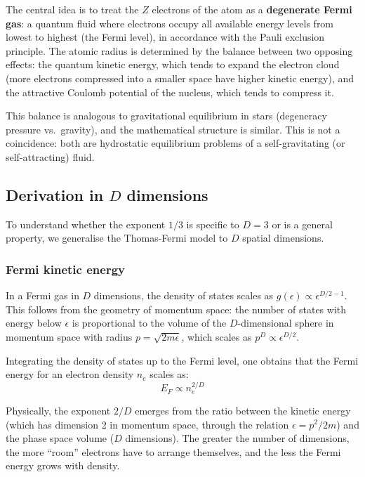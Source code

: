 \documentclass[10pt,a4paper]{article}
\begin{document}
The central idea is to treat the $Z$ electrons of the atom as a \textbf{degenerate Fermi gas}: a quantum fluid where electrons occupy all available energy levels from lowest to highest (the Fermi level), in accordance with the Pauli exclusion principle. The atomic radius is determined by the balance between two opposing effects: the quantum kinetic energy, which tends to expand the electron cloud (more electrons compressed into a smaller space have higher kinetic energy), and the attractive Coulomb potential of the nucleus, which tends to compress it.

This balance is analogous to gravitational equilibrium in stars (degeneracy pressure vs.\ gravity), and the mathematical structure is similar. This is not a coincidence: both are hydrostatic equilibrium problems of a self-gravitating (or self-attracting) fluid.

\subsection{Derivation in $D$ dimensions}

To understand whether the exponent $1/3$ is specific to $D = 3$ or is a general property, we generalise the Thomas-Fermi model to $D$ spatial dimensions.

\subsubsection{Fermi kinetic energy}

In a Fermi gas in $D$ dimensions, the density of states scales as $g(\epsilon) \propto \epsilon^{D/2 - 1}$. This follows from the geometry of momentum space: the number of states with energy below $\epsilon$ is proportional to the volume of the $D$-dimensional sphere in momentum space with radius $p = \sqrt{2m\epsilon}$, which scales as $p^D \propto \epsilon^{D/2}$.

Integrating the density of states up to the Fermi level, one obtains that the Fermi energy for an electron density $n_e$ scales as:
\begin{equation}
E_F \propto n_e^{2/D}
\end{equation}

Physically, the exponent $2/D$ emerges from the ratio between the kinetic energy (which has dimension 2 in momentum space, through the relation $\epsilon = p^2/2m$) and the phase space volume ($D$ dimensions). The greater the number of dimensions, the more ``room'' electrons have to arrange themselves, and the less the Fermi energy grows with density.
\end{document}
